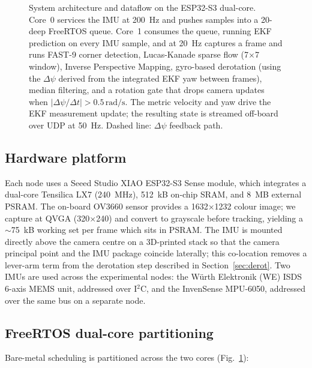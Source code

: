 \documentclass[conference]{IEEEtran}
\begin{document}
\begin{figure}[!t]
\caption{System architecture and dataflow on the ESP32-S3 dual-core.
Core~0 services the IMU at 200~Hz and pushes samples into a 20-deep
FreeRTOS queue. Core~1 consumes the queue, running EKF prediction on
every IMU sample, and at 20~Hz captures a frame and runs FAST-9 corner
detection, Lucas-Kanade sparse flow (7$\times$7 window),
Inverse Perspective Mapping, gyro-based derotation (using the
$\Delta\psi$ derived from the integrated EKF yaw between frames),
median filtering, and a rotation gate that drops camera updates when
$|\Delta\psi/\Delta t| > 0.5\,\mathrm{rad/s}$. The metric velocity
and yaw drive the EKF measurement update; the resulting state is
streamed off-board over UDP at 50~Hz. Dashed line: $\Delta\psi$
feedback path.}
\label{fig:arch}
\end{figure}


\subsection{Hardware platform}
Each node uses a Seeed Studio XIAO ESP32-S3 Sense module, which
integrates a dual-core Tensilica LX7 (240~MHz), 512~kB on-chip SRAM,
and 8~MB external PSRAM.  The on-board OV3660 sensor provides a
1632$\times$1232 colour image; we capture at QVGA (320$\times$240)
and convert to grayscale before tracking, yielding a $\sim$75~kB
working set per frame which sits in PSRAM.  The IMU is mounted directly above the
camera centre on a 3D-printed stack so that the camera principal
point and the IMU package coincide laterally; this co-location
removes a lever-arm term from the derotation step described in
Section~\ref{sec:derot}.  Two IMUs are used across the experimental
nodes: the W\"urth Elektronik (WE) ISDS 6-axis MEMS unit, addressed
over I${}^2$C, and the InvenSense MPU-6050, addressed over the same
bus on a separate node.

\subsection{FreeRTOS dual-core partitioning}
Bare-metal scheduling is partitioned across the two cores
(Fig.~\ref{fig:arch}):
\end{document}
